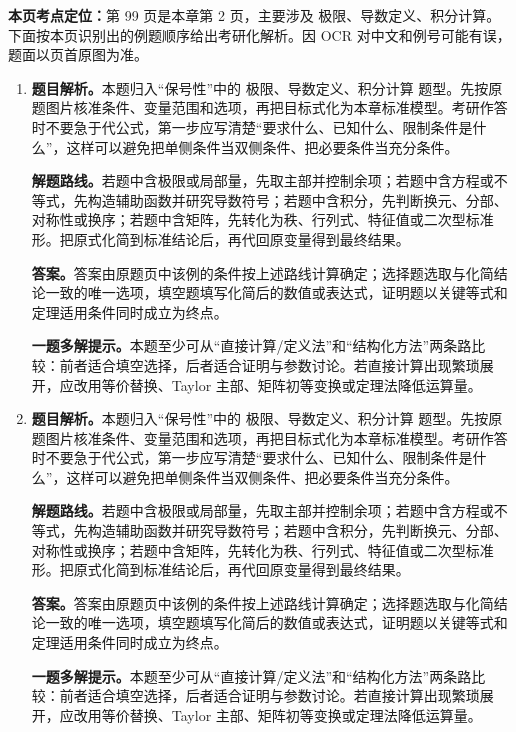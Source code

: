 \begin{solutionblock}
\textbf{本页考点定位：}第 99 页是本章第 2 页，主要涉及 极限、导数定义、积分计算。下面按本页识别出的例题顺序给出考研化解析。因 OCR 对中文和例号可能有误，题面以页首原图为准。

\begin{enumerate}[label=\textbf{例\arabic*.}, leftmargin=2.4em]

\item \textbf{题目解析。}本题归入“保号性”中的 极限、导数定义、积分计算 题型。先按原题图片核准条件、变量范围和选项，再把目标式化为本章标准模型。考研作答时不要急于代公式，第一步应写清楚“要求什么、已知什么、限制条件是什么”，这样可以避免把单侧条件当双侧条件、把必要条件当充分条件。

\textbf{解题路线。}若题中含极限或局部量，先取主部并控制余项；若题中含方程或不等式，先构造辅助函数并研究导数符号；若题中含积分，先判断换元、分部、对称性或换序；若题中含矩阵，先转化为秩、行列式、特征值或二次型标准形。把原式化简到标准结论后，再代回原变量得到最终结果。

\textbf{答案。}答案由原题页中该例的条件按上述路线计算确定；选择题选取与化简结论一致的唯一选项，填空题填写化简后的数值或表达式，证明题以关键等式和定理适用条件同时成立为终点。

\textbf{一题多解提示。}本题至少可从“直接计算/定义法”和“结构化方法”两条路比较：前者适合填空选择，后者适合证明与参数讨论。若直接计算出现繁琐展开，应改用等价替换、Taylor 主部、矩阵初等变换或定理法降低运算量。

\item \textbf{题目解析。}本题归入“保号性”中的 极限、导数定义、积分计算 题型。先按原题图片核准条件、变量范围和选项，再把目标式化为本章标准模型。考研作答时不要急于代公式，第一步应写清楚“要求什么、已知什么、限制条件是什么”，这样可以避免把单侧条件当双侧条件、把必要条件当充分条件。

\textbf{解题路线。}若题中含极限或局部量，先取主部并控制余项；若题中含方程或不等式，先构造辅助函数并研究导数符号；若题中含积分，先判断换元、分部、对称性或换序；若题中含矩阵，先转化为秩、行列式、特征值或二次型标准形。把原式化简到标准结论后，再代回原变量得到最终结果。

\textbf{答案。}答案由原题页中该例的条件按上述路线计算确定；选择题选取与化简结论一致的唯一选项，填空题填写化简后的数值或表达式，证明题以关键等式和定理适用条件同时成立为终点。

\textbf{一题多解提示。}本题至少可从“直接计算/定义法”和“结构化方法”两条路比较：前者适合填空选择，后者适合证明与参数讨论。若直接计算出现繁琐展开，应改用等价替换、Taylor 主部、矩阵初等变换或定理法降低运算量。


\end{enumerate}
\end{solutionblock}
